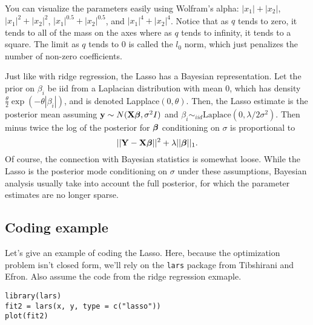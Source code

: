 You can visualize the parameters easily using Wolfram's alpha:
\href{http://www.wolframalpha.com/input/?i=abs\%28x1\%29+\%2B+abs\%28x2\%29+\%3D+1}{$|x_1| + |x_2|$},
\href{http://www.wolframalpha.com/input/?i=abs\%28x1\%29\%5E2+\%2B+abs\%28x2\%29\%5E2+\%3D+1}{$|x_1|^2 + |x_2|^2$},
\href{http://www.wolframalpha.com/input/?i=abs\%28x1\%29\%5E0.5+\%2B+abs\%28x2\%29\%5E0.5+\%3D+1}{$|x_1|^0.5 + |x_2|^0.5$},
and \href{http://www.wolframalpha.com/input/?i=plot+abs\%28x1\%29\%5E4+\%2B+abs\%28x2\%29\%5E4+\%3D+1}{$|x_1|^4 + |x_2|^4$}.
Notice that as $q$ tends to zero, it tends to all of the mass on the axes where as $q$ tends to infinity, it tends
to a square. The limit as $q$ tends to 0 is called the $l_0$ norm, which just penalizes the number
of non-zero coefficients. 

Just like with ridge regression, the Lasso has a Bayesian representation. Let
the prior on $\beta_i$ be iid from a Laplacian distribution with mean 0, which has
density $\frac{\theta}{2}\exp(- \theta |\beta_i|)$, and is denoted Lapplace$(0, \theta)$. 
Then, the Lasso estimate is
the posterior mean assuming $\mathbf{y} \sim N(\mathbf{X} \boldsymbol{\beta}, \sigma^2 I)$ and 
$\beta_i \sim_{iid} \mbox{Laplace}(0, \lambda / 2\sigma^2)$. Then minus twice 
the log of the posterior for $\boldsymbol{\beta}$ conditioning on $\sigma$ is proportional to
$$
||\mathbf{Y} - \mathbf{X} \boldsymbol{\beta}||^2 + \lambda ||\boldsymbol{\beta}||_{1}.
$$
Of course, the connection with Bayesian statistics is somewhat loose. While the Lasso is the
posterior mode conditioning on $\sigma$ under these assumptions, Bayesian analysis usually
take into account the full posterior, for which the parameter estimates are no longer sparse.




\subsection{Coding example}

Let's give an example of coding the Lasso. Here, because the optimization
problem isn't closed form, we'll rely on the \texttt{lars} package from
Tibshirani and Efron. Also assume the code from the ridge regression exmaple.

\begin{verbatim}
library(lars)
fit2 = lars(x, y, type = c("lasso"))
plot(fit2)
\end{verbatim}



